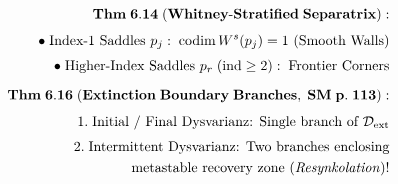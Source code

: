 \documentclass[preview]{standalone}
\begin{document}
\begin{align*}
\special{dvisvgm:raw <g id='unique000'>}\mathbf{Thm\;6.14\;(Whitney\text{-}Stratified\;Separatrix):}\\[4pt]\bullet\;\text{Index-1 Saddles }p_j:\;\operatorname{codim} W^s(p_j) = 1\text{ (Smooth Walls)}\\[3pt]\bullet\;\text{Higher-Index Saddles }p_r\;(\operatorname{ind}\ge 2):\;\text{Frontier Corners}\\[6pt]\mathbf{Thm\;6.16\;(Extinction\;Boundary\;Branches,\;SM\;p.\;113):}\\[4pt]1.\;\text{Initial / Final Dysvarianz: Single branch of }\mathcal{D}_{\text{ext}}\\[3pt]2.\;\text{Intermittent Dysvarianz: Two branches enclosing}\\\;\;\text{metastable recovery zone (\textit{Resynkolation})!}\special{dvisvgm:raw </g>}
\end{align*}
\end{document}
